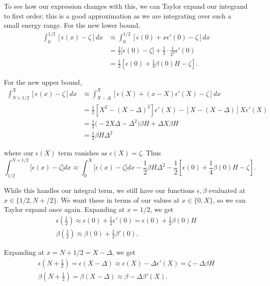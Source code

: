 \documentclass[12pt]{revtex4-2}
\begin{document}
To see how our expression changes with this, we can Taylor expand our integrand to first order; this is a good approximation as we are integrating over such a small energy range.  For the new lower bound, 
\begin{align}
    \int_0^{1/2} [\epsilon(x)-\zeta]dx &\approx \int_0^{1/2} [\epsilon(0) + x\epsilon'(0) - \zeta]dx \\
    &= \frac{1}{2}\big[ \epsilon(0) - \zeta \big] + \frac{1}{2}\cdot\frac{1}{2^2}\epsilon'(0) \\
    &= \frac{1}{2}\left[ \epsilon(0) + \frac{1}{4}\beta(0)H - \zeta \right].
\end{align}

For the new upper bound, 
\begin{align}
    \int_{N+1/2}^{X} [\epsilon(x)-\zeta]dx &\approx \int_{X-\Delta}^{X} [\epsilon(X) + (x-X)\epsilon'(X) - \zeta]dx \\
    &= \frac{1}{2}\left[ X^2 - \left( X-\Delta \right)^2 \right]\epsilon'(X) - \left[X - \left(X-\Delta\right) \right]X\epsilon'(X) \\
    &= \frac{1}{2}\big( -2X\Delta - \Delta^2 \big)\beta H + \Delta X \beta H \\
    &= \frac{1}{2}\beta H \Delta^2
\end{align}

where our $\epsilon(X)$ term vanishes as $\epsilon(X) = \zeta$.  Thus
\begin{equation}
    \int_{1/2}^{N+1/2}\big[\epsilon(x)-\zeta\big]dx \approx \int_0^X \big[\epsilon(x)-\zeta\big]dx - \frac{1}{2}\beta H \Delta^2 - \frac{1}{2}\left[ \epsilon(0) + \frac{1}{4}\beta(0)H - \zeta \right].
\end{equation}

While this handles our integral term, we still have our functions $\epsilon,\beta$ evaluated at $x \in \{1/2,N+/2\}$.  We want these in terms of our values at $x \in \{0,X\}$, so we can Taylor expand once again.  Expanding at $x=1/2$, we get
\begin{gather}
    \epsilon\left( \frac{1}{2} \right) \approx \epsilon(0) + \frac{1}{2}\epsilon'(0) = \epsilon(0) + \frac{1}{2}\beta(0)H \\
    \beta\left( \frac{1}{2} \right) \approx \beta(0) + \frac{1}{2}\beta'(0).
\end{gather}

Expanding at $x = N + 1/2 = X - \Delta$, we get 
\begin{gather}
    \epsilon\left(N + \frac{1}{2}\right) = \epsilon(X-\Delta) \approx \epsilon(X) - \Delta \epsilon'(X) = \zeta - \Delta \beta H \\
    \beta\left(N + \frac{1}{2}\right) = \beta(X-\Delta) \approx \beta - \Delta \beta'(X).
\end{gather}
\end{document}
